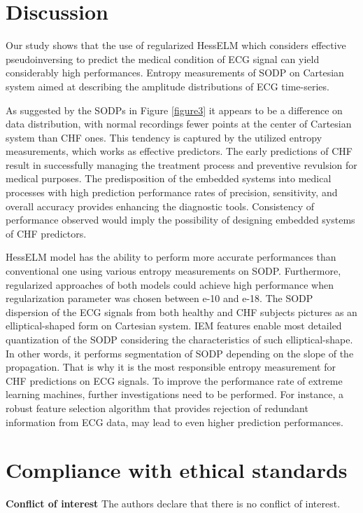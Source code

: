 \documentclass[twocolumn]{svjour3}
\begin{document}
\section{Discussion}
\label{discussion}
Our study shows that the use of regularized HessELM which considers effective pseudoinversing to predict the medical condition of ECG signal can yield considerably high performances. Entropy measurements of SODP on Cartesian system aimed at describing the amplitude  distributions of ECG time-series.

As suggested by the SODPs in Figure \ref{figure3} it appears to be a difference on data distribution, with normal recordings fewer points at the center of Cartesian system than CHF ones. This tendency is captured by the utilized entropy measurements, which works as effective predictors. The early predictions of  CHF result in successfully managing the treatment process and preventive revulsion for medical purposes. The predisposition of the embedded systems into medical processes with high prediction performance rates of precision, sensitivity, and overall accuracy provides enhancing the diagnostic tools. Consistency of performance observed would imply the possibility of designing embedded systems of CHF predictors.

HessELM model has the ability to perform more accurate performances than  conventional one using various entropy measurements on SODP. Furthermore, regularized approaches of both models could achieve high performance  when regularization parameter was chosen between e-10 and e-18. The SODP dispersion of the ECG signals from both healthy and CHF subjects pictures as an elliptical-shaped form on Cartesian system. IEM features enable most detailed quantization of the SODP considering the characteristics of such elliptical-shape. In other words, it performs segmentation of SODP depending on the slope of the propagation. That is why it is the most responsible entropy measurement for CHF predictions on ECG signals.
To improve the performance rate of extreme learning machines, further investigations need to be performed. For instance, a robust feature selection algorithm that provides rejection of redundant information from ECG data, may lead to even higher prediction performances.

\section*{\small{Compliance with ethical standards}}
\textbf{\small{Conflict of interest}} \small{The authors declare that there is no conflict of interest.}
\end{document}
